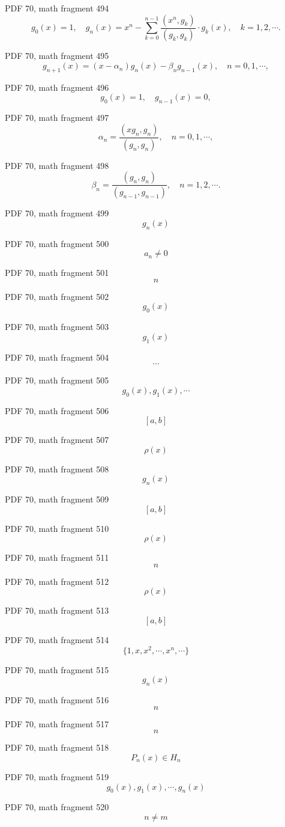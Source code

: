 \documentclass[UTF8,fontset=fandol]{ctexart}
\begin{document}
PDF 70, math fragment 494
\[
g_0(x) = 1, \quad g_n(x) = x^n - \sum_{k=0}^{n-1} \frac{(x^n, g_k)}{(g_k, g_k)} \cdot g_k(x), \quad k = 1, 2, \cdots.
\]
\par
PDF 70, math fragment 495
\[
g_{n+1}(x) = (x - \alpha_n)g_n(x) - \beta_n g_{n-1}(x), \quad n = 0, 1, \cdots,
\]
\par
PDF 70, math fragment 496
\[
g_0(x) = 1, \quad g_{n-1}(x) = 0,
\]
\par
PDF 70, math fragment 497
\[
\alpha_n = \frac{(xg_n, g_n)}{(g_n, g_n)}, \quad n = 0, 1, \cdots,
\]
\par
PDF 70, math fragment 498
\[
\beta_n = \frac{(g_n, g_n)}{(g_{n-1}, g_{n-1})}, \quad n = 1, 2, \cdots.
\]
\par
PDF 70, math fragment 499
\[g_n(x)\]
\par
PDF 70, math fragment 500
\[a_n \neq 0\]
\par
PDF 70, math fragment 501
\[n\]
\par
PDF 70, math fragment 502
\[g_0(x)\]
\par
PDF 70, math fragment 503
\[g_1(x)\]
\par
PDF 70, math fragment 504
\[\cdots\]
\par
PDF 70, math fragment 505
\[g_0(x), g_1(x), \cdots\]
\par
PDF 70, math fragment 506
\[[a, b]\]
\par
PDF 70, math fragment 507
\[\rho(x)\]
\par
PDF 70, math fragment 508
\[g_n(x)\]
\par
PDF 70, math fragment 509
\[[a, b]\]
\par
PDF 70, math fragment 510
\[\rho(x)\]
\par
PDF 70, math fragment 511
\[n\]
\par
PDF 70, math fragment 512
\[\rho(x)\]
\par
PDF 70, math fragment 513
\[[a, b]\]
\par
PDF 70, math fragment 514
\[\{1, x, x^2, \cdots, x^n, \cdots\}\]
\par
PDF 70, math fragment 515
\[g_n(x)\]
\par
PDF 70, math fragment 516
\[n\]
\par
PDF 70, math fragment 517
\[n\]
\par
PDF 70, math fragment 518
\[P_n(x) \in H_n\]
\par
PDF 70, math fragment 519
\[g_0(x), g_1(x), \cdots, g_n(x)\]
\par
PDF 70, math fragment 520
\[n \neq m\]
\par
\end{document}
